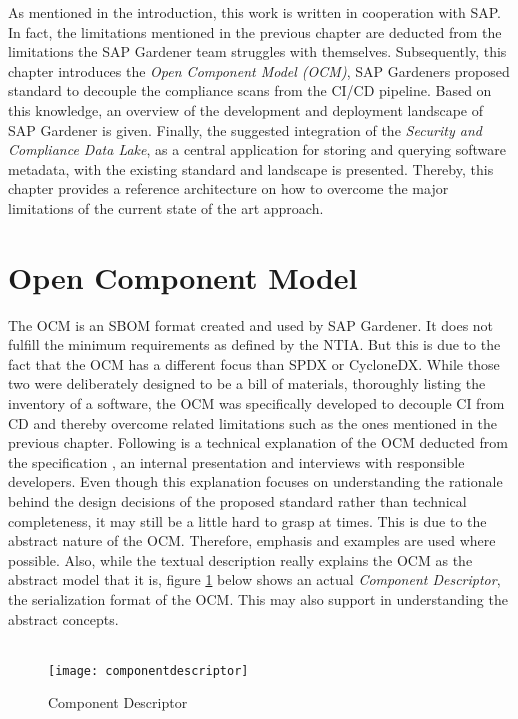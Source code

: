 As mentioned in the introduction, this work is written in cooperation with SAP. In fact, the limitations mentioned in the previous chapter are deducted from the limitations the SAP Gardener team struggles with themselves. Subsequently, this chapter introduces the \textit{Open Component Model (OCM)}, SAP Gardeners proposed standard to decouple the compliance scans from the CI/CD pipeline. Based on this knowledge, an overview of the development and deployment landscape of SAP Gardener is given. Finally, the suggested integration of the \emph{Security and Compliance Data Lake}, as a central application for storing and querying software metadata, with the existing standard and landscape is presented. Thereby, this chapter provides a reference architecture on how to overcome the major limitations of the current state of the art approach. 

\section{Open Component Model} \label{sec:Open Component Model}
The OCM is an SBOM format created and used by SAP Gardener. It does not fulfill the minimum requirements as defined by the NTIA. But this is due to the fact that the OCM has a different focus than SPDX or CycloneDX. While those two were deliberately designed to be a bill of materials, thoroughly listing the inventory of a software, the OCM was specifically developed to decouple CI from CD and thereby overcome related limitations such as the ones mentioned in the previous chapter. Following is a technical explanation of the OCM deducted from the specification \cite{OCMSpec}, an internal presentation \cite{OCMInternalPresentation} and interviews with responsible developers. Even though this explanation focuses on understanding the rationale behind the design decisions of the proposed standard rather than technical completeness, it may still be a little hard to grasp at times. This is due to the abstract nature of the OCM. Therefore, emphasis and examples are used where possible. Also, while the textual description really explains the OCM as the abstract model that it is, figure \ref{fig:ComponentDescriptor} below shows an actual \emph{Component Descriptor}, the serialization format of the OCM. This may also support in understanding the abstract concepts.\\\\

\begin{figure}[H]
	\centering
	\texttt{[image: componentdescriptor]}
	\caption[Component Descriptor]{Component Descriptor }
	\label{fig:ComponentDescriptor}
\end{figure}


